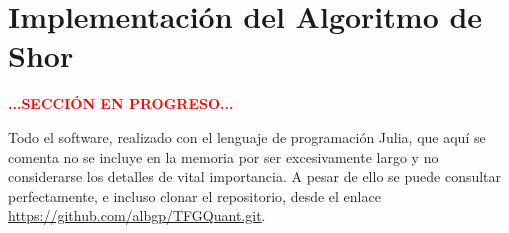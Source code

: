 \documentclass[11pt, spanish]{report}
\newcommand{\red}[1]{\textcolor{red}{#1}}
\numberwithin{equation}{section}
\numberwithin{defin}{section}
\begin{document}

%

\section{Implementación del Algoritmo de Shor}

\begin{center}
\red{\textbf{...SECCIÓN EN PROGRESO...}}
\end{center}


Todo el software, realizado con el lenguaje de programación Julia, que aquí se comenta no se incluye en la memoria por ser excesivamente largo y no considerarse los detalles de vital importancia. A pesar de ello se puede consultar perfectamente, e incluso clonar el repositorio, desde el enlace \url{https://github.com/albgp/TFGQuant.git}. \cite{2016arXiv161208091S}\cite{2002quant.ph..5095B}
\end{document}
